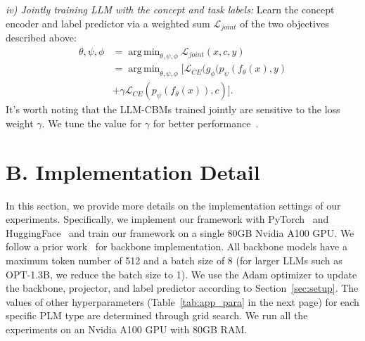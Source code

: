 \documentclass[letterpaper]{article} %
\DeclareMathOperator*{\argmin}{arg\,min}
\begin{document}
\noindent\textit{iv) Jointly training LLM with the concept and task labels:} Learn the concept encoder and label predictor via a weighted sum $\mathcal{L}_{joint}$ of the two objectives described above:
\begin{equation*}
\begin{aligned}
    \theta, \psi, \phi &= \argmin_{\theta, \psi, \phi} \mathcal{L}_{joint}(x, c, y) \\ &= \argmin_{\theta, \psi, \phi} [\mathcal{L}_{CE} (g_{\phi}(p_\psi(f_\theta(x),y) \\ &+ \gamma \mathcal{L}_{CE} (p_\psi(f_\theta(x)),c)].
\end{aligned}
\end{equation*} 
 It's worth noting that the LLM-CBMs trained jointly are sensitive to the loss weight $\gamma$. We tune the value for $\gamma$ for better performance~\citep{tan2023cbm}.

 \section{B. Implementation Detail}\label{app:implement}
 In this section, we provide more details on the implementation settings of our experiments. Specifically, we implement our framework with PyTorch~\cite{paszke2017automatic} and HuggingFace~\cite{wolf2020huggingfaces} and train our framework on a single 80GB Nvidia A100 GPU. We follow a prior work~\citep{abraham2022cebab} for backbone implementation. All backbone models have a maximum token number of 512 and a batch size of 8 (for larger LLMs such as OPT-1.3B, we reduce the batch size to 1). We use the Adam optimizer to update the backbone, projector, and label predictor according to Section~\ref{sec:setup}. The values of other hyperparameters (Table~\ref{tab:app_para} in the next page) for each specific PLM type are determined through grid search. We run all the experiments on an Nvidia A100 GPU with 80GB RAM.
\end{document}
